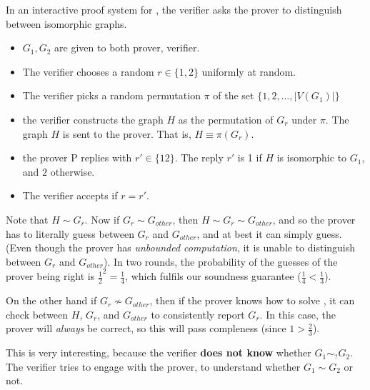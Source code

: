 In an interactive proof system for \gni, the verifier asks the prover to
distinguish between isomorphic graphs.

\begin{itemize}
\item $G_1, G_2$ are given to both prover, verifier.

\item The verifier chooses a random  $r \in \{1, 2\}$ uniformly at random.

\item The verifier picks a random permutation $\pi$ of the set $\{1, 2,\dots, |V(G_1)|\}$

\item the verifier constructs the graph $H$ as the permutation of $G_r$ under $\pi$.
The graph $H$ is sent to the prover. That is, $H \equiv \pi(G_r)$.

\item the prover P replies with $r' \in \{1 2\}$. The reply $r'$ is 1
if $H$ is isomorphic to $G_1$, and $2$ otherwise.

\item The verifier accepts if $r = r'$.
\end{itemize}

Note that $H \sim G_r$. Now if $G_r \sim G_{other}$, then $H \sim G_r \sim G_{other}$, and
so the prover has to literally guess between $G_r$ and $G_{other}$, and at best
it can simply guess. (Even though the prover has \textit{unbounded computation},
it is unable to distinguish between $G_r$ and $G_{other}$). In two rounds,
the probability of the guesses of the prover being right is $\frac{1}{2}^2 = \frac{1}{4}$,
which fulfils our soundness guarantee ($\frac{1}{4} < \frac{1}{3}$).

On the other hand if $G_r \nsim G_{other}$, then if the prover knows how to solve
\gni , it can check between $H$, $G_r$, and $G_{other}$ to consistently
report $G_r$. In this case, the prover will \textit{always} be correct,
so this will pass compleness (since $1 > \frac{2}{3}$).

This is very interesting, because the verifier \textbf{does not know} whether
$G_1 \sim_? G_2$. The verifier tries to engage with the prover, to understand
whether $G_1 \sim G_2$ or not.
